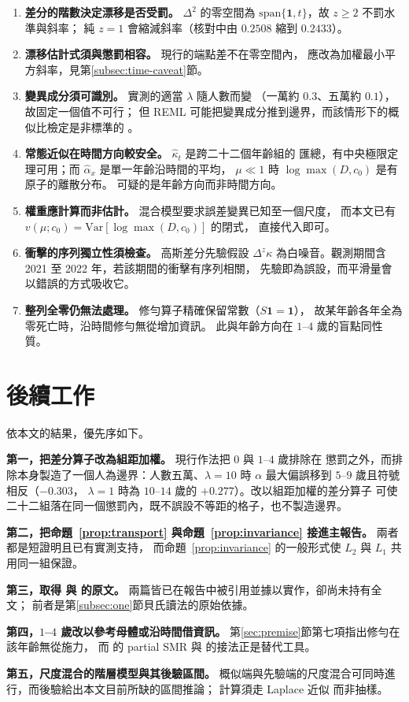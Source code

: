 \documentclass[UTF8, fontset=macnew, a4paper, 12pt]{ctexart}
\begin{document}
\begin{enumerate}[label=\arabic*.]
\item \textbf{差分的階數決定漂移是否受罰。} $\Delta^2$ 的零空間為
$\mathrm{span}\{\mathbf 1,t\}$，故 $z\ge2$ 不罰水準與斜率；
純 $z=1$ 會縮減斜率（核對中由 $0.2508$ 縮到 $0.2433$）。
\item \textbf{漂移估計式須與懲罰相容。} 現行的端點差不在零空間內，
應改為加權最小平方斜率，見第\ref{subsec:time-caveat}節。
\item \textbf{變異成分須可識別。} 實測的適當 $\lambda$ 隨人數而變
（一萬約 $0.3$、五萬約 $0.1$），故固定一個值不可行；
但 REML 可能把變異成分推到邊界，而該情形下的概似比檢定是非標準的
\citep{crainiceanu2004}。
\item \textbf{常態近似在時間方向較安全。} $\hat\kappa_t$ 是跨二十二個年齡組的
匯總，有中央極限定理可用；而 $\hat\alpha_x$ 是單一年齡沿時間的平均，
$\mu\ll1$ 時 $\log\max(D,c_0)$ 是有原子的離散分布。
可疑的是年齡方向而非時間方向。
\item \textbf{權重應計算而非估計。} 混合模型要求誤差變異已知至一個尺度，
而本文已有 $v(\mu;c_0)=\mathrm{Var}[\log\max(D,c_0)]$ 的閉式，
直接代入即可。
\item \textbf{衝擊的序列獨立性須檢查。} 高斯差分先驗假設 $\Delta^{z}\kappa$
為白噪音。觀測期間含 2021 至 2022 年，若該期間的衝擊有序列相關，
先驗即為誤設，而平滑量會以錯誤的方式吸收它。
\item \textbf{整列全零仍無法處理。} 修勻算子精確保留常數（$S\mathbf 1=\mathbf 1$），
故某年齡各年全為零死亡時，沿時間修勻無從增加資訊。
此與年齡方向在 $1$--$4$ 歲的盲點同性質。
\end{enumerate}

\section{後續工作}\label{sec:next}

依本文的結果，優先序如下。

\textbf{第一，把差分算子改為組距加權。} 現行作法把 $0$ 與 $1$--$4$ 歲排除在
懲罰之外，而排除本身製造了一個人為邊界：人數五萬、$\lambda=10$ 時
$\alpha$ 最大偏誤移到 $5$--$9$ 歲且符號相反（$-0.303$，
$\lambda=1$ 時為 $10$--$14$ 歲的 $+0.277$）。改以組距加權的差分算子
可使二十二組落在同一個懲罰內，既不誤設不等距的格子，也不製造邊界。

\textbf{第二，把命題~\ref{prop:transport} 與命題~\ref{prop:invariance} 接進主報告。} 兩者都是短證明且已有實測支持，
而命題~\ref{prop:invariance} 的一般形式使 $L_2$ 與 $L_1$ 共用同一組保證。

\textbf{第三，取得 \citet{kimeldorf1967} 與 \citet{whittaker1923} 的原文。}
兩篇皆已在報告中被引用並據以實作，卻尚未持有全文；
前者是第\ref{subsec:one}節貝氏讀法的原始依據。

\textbf{第四，$1$--$4$ 歲改以參考母體或沿時間借資訊。}
第\ref{sec:premise}節第七項指出修勻在該年齡無從施力，
而 \citet{lee2003} 的 partial SMR 與 \citet{yue2019} 的接法正是替代工具。

\textbf{第五，尺度混合的階層模型與其後驗區間。}
概似端與先驗端的尺度混合可同時進行，而後驗給出本文目前所缺的區間推論；
計算須走 Laplace 近似 \citep{rue2009} 而非抽樣。

\clearpage


\end{document}
